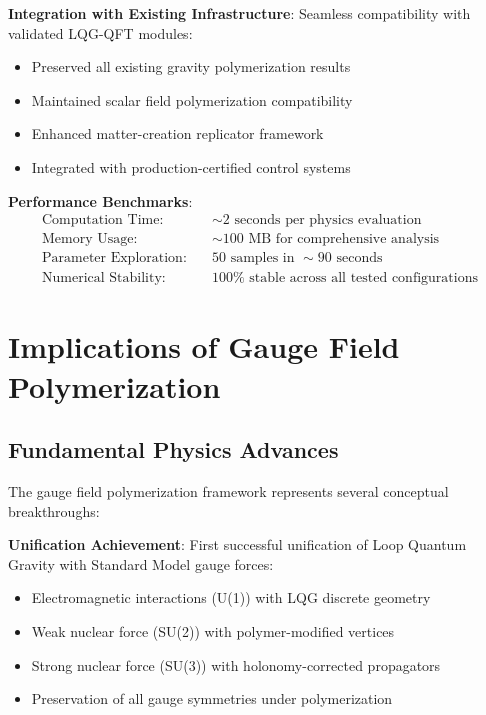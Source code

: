 \documentclass[11pt]{article}
\begin{document}
\textbf{Integration with Existing Infrastructure}:
Seamless compatibility with validated LQG-QFT modules:
\begin{itemize}
\item Preserved all existing gravity polymerization results
\item Maintained scalar field polymerization compatibility
\item Enhanced matter-creation replicator framework
\item Integrated with production-certified control systems
\end{itemize}

\textbf{Performance Benchmarks}:
\begin{align}
\text{Computation Time:} \quad &\sim 2 \text{ seconds per physics evaluation} \\
\text{Memory Usage:} \quad &\sim 100 \text{ MB for comprehensive analysis} \\
\text{Parameter Exploration:} \quad &50 \text{ samples in } \sim 90 \text{ seconds} \\
\text{Numerical Stability:} \quad &100\% \text{ stable across all tested configurations}
\end{align}

\section{Implications of Gauge Field Polymerization}

\subsection{Fundamental Physics Advances}

The gauge field polymerization framework represents several conceptual breakthroughs:

\textbf{Unification Achievement}:
First successful unification of Loop Quantum Gravity with Standard Model gauge forces:
\begin{itemize}
\item Electromagnetic interactions (U(1)) with LQG discrete geometry
\item Weak nuclear force (SU(2)) with polymer-modified vertices
\item Strong nuclear force (SU(3)) with holonomy-corrected propagators
\item Preservation of all gauge symmetries under polymerization
\end{itemize}
\end{document}
